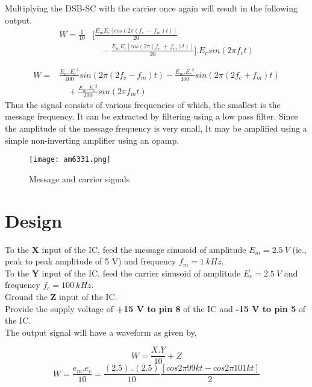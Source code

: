 Multiplying the DSB-SC with the carrier once again will result in the following output.
\begin{equation}
\begin{split}
W=\frac{1}{10} &[ \frac{E_mE_c [cos (2\pi (f_c\ -\ f_m)t)]}{20} \\
&\quad -\frac{E_mE_c[cos (2\pi (f_c\ +\ f_m)t)]}{20}].
 E_c sin(2\pi f_ct)
\end{split}
\end{equation}

\begin{equation}
\begin{split}
W=& \frac{E_m.{E_c}^2}{400}sin(2\pi (2f_c-f_m)t)  -  \frac{E_m.{E_c}^2}{400}sin(2\pi (2f_c+f_m)t)\\ 
&\quad +\frac{E_m.{E_c}^2}{200}sin(2\pi f_mt)
\end{split}
\end{equation}
Thus the signal consists of various frequencies of which, the smallest is the message frequency. It can be extracted by filtering using a low pass filter. Since the amplitude of the message frequency is very small, It may be amplified using a simple non-inverting amplifier using an opamp.

\begin{figure}[ht]
\texttt{[image: am6331.png]}
\caption{Message and carrier signals}
\label{msg633plot1}
\end{figure}
\section*{Design}

To the \textbf{X} input of the IC, feed the message sinusoid of amplitude $E_m=2.5\ V$ (ie., peak to peak amplitude of 5 V) and frequency $f_m= 1\ kHz$.\\

To the \textbf{Y} input of the IC, feed the carrier sinusoid of amplitude $E_c=2.5\ V$ and frequency $f_c= 100\ kHz$.\\
Ground the \textbf{Z} input of the IC.\\
Provide the supply voltage of \textbf{+15 V to pin 8} of the IC and \textbf{-15 V to pin 5} of the IC.\\

The output signal will have a waveform as given by,

\begin{equation}
W=\frac{X.Y}{10}+Z
\end{equation}
\begin{equation}
W=\frac{e_m.e_c}{10}=\frac{(2.5) \ .(2.5)}{10}\frac{[cos 2\pi99kt-cos 2\pi101kt]}{2}
\end{equation}

